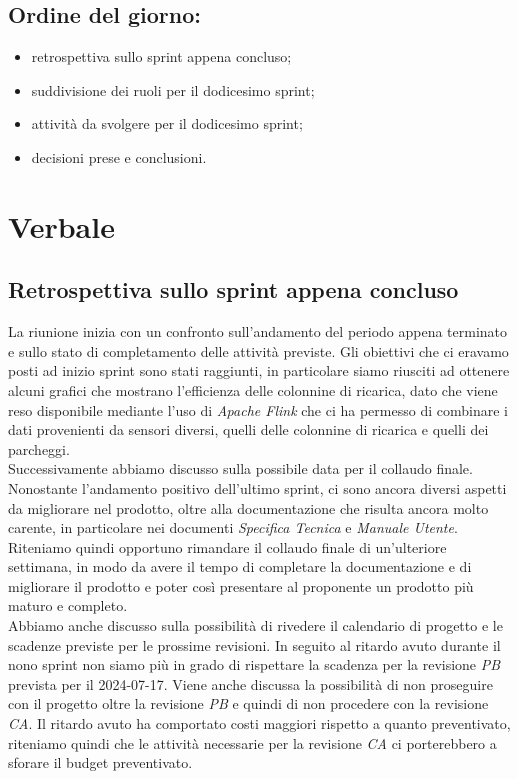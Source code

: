 \documentclass[italian,12pt]{article}
\begin{document}
\subsection*{Ordine del giorno:}
\begin{itemize}
	\item retrospettiva sullo sprint appena concluso;
	\item suddivisione dei ruoli per il dodicesimo sprint;
	\item attività da svolgere per il dodicesimo sprint;
	\item decisioni prese e conclusioni.
\end{itemize}


\newpage

\section{Verbale}

\subsection{Retrospettiva sullo sprint appena concluso}
La riunione inizia con un confronto sull'andamento del periodo appena terminato e sullo stato di completamento delle attività previste. Gli obiettivi che ci eravamo posti ad inizio sprint sono stati raggiunti, in particolare siamo riusciti ad ottenere alcuni grafici che mostrano l'efficienza delle colonnine di ricarica, dato che viene reso disponibile mediante l'uso di \textit{Apache Flink} che ci ha permesso di combinare i dati provenienti da sensori diversi, quelli delle colonnine di ricarica e quelli dei parcheggi. \\
Successivamente abbiamo discusso sulla possibile data per il collaudo finale. Nonostante l'andamento positivo dell'ultimo sprint, ci sono ancora diversi aspetti da migliorare nel prodotto, oltre alla documentazione che risulta ancora molto carente, in particolare nei documenti \textit{Specifica Tecnica} e \textit{Manuale Utente}. Riteniamo quindi opportuno rimandare il collaudo finale di un'ulteriore settimana, in modo da avere il tempo di completare la documentazione e di migliorare il prodotto e poter così presentare al proponente un prodotto più maturo e completo. \\
Abbiamo anche discusso sulla possibilità di rivedere il calendario di progetto e le scadenze previste per le prossime revisioni. In seguito al ritardo avuto durante il nono sprint non siamo più in grado di rispettare la scadenza per la revisione \textit{PB} prevista per il 2024-07-17. Viene anche discussa la possibilità di non proseguire con il progetto oltre la revisione \textit{PB} e quindi di non procedere con la revisione \textit{CA}. Il ritardo avuto ha comportato costi maggiori rispetto a quanto preventivato, riteniamo quindi che le attività necessarie per la revisione \textit{CA} ci porterebbero a sforare il budget preventivato.
\end{document}
